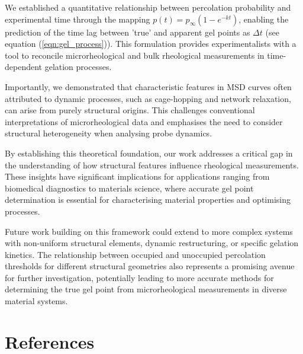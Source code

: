 \documentclass[%
 aip,
 amsmath,amssymb,
reprint, onecolumn %
]{revtex4-1}
\begin{document}
We established a quantitative relationship between percolation probability and experimental time through the mapping $p(t) = p_\infty(1-e^{-kt})$, enabling the prediction of the time lag between 'true' and apparent gel points as $\Delta t$ (see equation (\ref{eqn:gel_process})). This formulation provides experimentalists with a tool to reconcile microrheological and bulk rheological measurements in time-dependent gelation processes.

Importantly, we demonstrated that characteristic features in MSD curves often attributed to dynamic processes, such as cage-hopping and network relaxation, can arise from purely structural origins. This challenges conventional interpretations of microrheological data and emphasises the need to consider structural heterogeneity when analysing probe dynamics.

By establishing this theoretical foundation, our work addresses a critical gap in the understanding of how structural features influence rheological measurements. These insights have significant implications for applications ranging from biomedical diagnostics to materials science, where accurate gel point determination is essential for characterising material properties and optimising processes.

Future work building on this framework could extend to more complex systems with non-uniform structural elements, dynamic restructuring, or specific gelation kinetics. The relationship between occupied and unoccupied percolation thresholds for different structural geometries also represents a promising avenue for further investigation, potentially leading to more accurate methods for determining the true gel point from microrheological measurements in diverse material systems.






\section{References}


\newpage
\appendix
\end{document}
